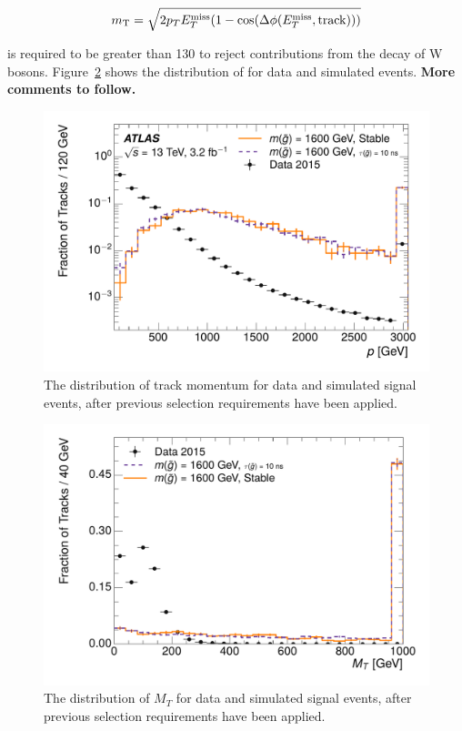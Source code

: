 \begin{equation}
 m_{\mathrm{T}} = \sqrt{2 p_T E_T^{\mathrm{miss}} (1-\cos(\Delta\phi (E_T^{\mathrm{miss}},\mathrm{track})) ) }
\end{equation}

\noindent is required to be greater than 130 \GeV to reject contributions from the decay of W bosons.
Figure~\ref{fig:nm1_mt} shows the distribution of \mt for data and simulated events. \textbf{More comments to follow.}


\begin{figure}[h]
\centering
\includegraphics[width=\fullfig]{figures/selection_p_nm1.pdf}
\caption{The distribution of track momentum for data and simulated signal events, after previous selection requirements have been applied.}
\label{fig:nm1_p}
\end{figure}


\begin{figure}[h]
\centering
\includegraphics[draft, width=\fullfig]{figures/selection_mt_nm1.pdf}
\caption{The distribution of $M_T$ for data and simulated signal events, after previous selection requirements have been applied.}
\label{fig:nm1_mt}
\end{figure}

